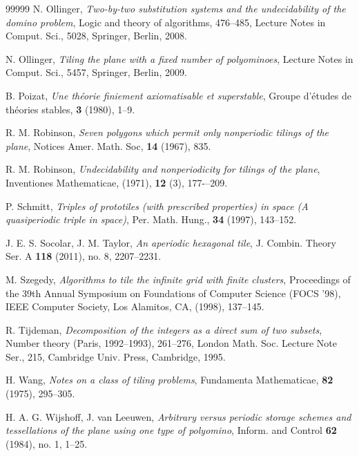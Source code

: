 \documentclass[reqno,a4paper,12pt]{amsart}
\numberwithin{equation}{section}
\numberwithin{figure}{section}
\theoremstyle{plain}
\theoremstyle{definition}
\begin{document}
\begin{thebibliography}{99999}
		N. Ollinger, \emph{Two-by-two substitution systems and the undecidability of the domino problem}, Logic and theory of algorithms, 476–485,
Lecture Notes in Comput. Sci., 5028, Springer, Berlin, 2008.

N. Ollinger, \emph{Tiling the plane with a fixed number of polyominoes},
Lecture Notes in Comput. Sci., 5457, Springer, Berlin, 2009.

		B. Poizat, \emph{Une th\'eorie finiement axiomatisable et superstable}, Groupe d’\'etudes de th\'eories
stables, \textbf{3} (1980), 1--9.

		R. M. Robinson, \emph{Seven polygons which permit only nonperiodic tilings of the plane}, Notices Amer.
Math. Soc, \textbf{14} (1967), 835.
		
		R. M. Robinson,   \emph{Undecidability and nonperiodicity for tilings of the plane}, Inventiones Mathematicae, (1971), \textbf{12} (3), 177-–209.
		
	P. Schmitt, \emph{Triples of prototiles (with prescribed properties) in space (A quasiperiodic triple in space)}, Per. Math. Hung., \textbf{34} (1997), 143--152.
	
J. E. S. Socolar, J. M. Taylor, \emph{An aperiodic hexagonal tile},
J. Combin. Theory Ser. A \textbf{118} (2011), no. 8, 2207--2231.

	M. Szegedy, \emph{Algorithms to tile the infinite grid with finite clusters}, Proceedings of the
39th Annual Symposium on Foundations of Computer Science (FOCS ’98), IEEE Computer Society, Los Alamitos, CA, (1998), 137--145.

		R. Tijdeman, \emph{Decomposition of the integers as a direct sum of two subsets}, Number theory (Paris, 1992--1993), 261--276, London Math. Soc. Lecture Note Ser., 215, Cambridge Univ. Press, Cambridge, 1995.
		
		 H. Wang, \emph{Notes on a class of tiling problems}, Fundamenta Mathematicae, \textbf{82} (1975), 295--305.
		 
		 H. A. G. Wijshoff, J. van Leeuwen, \emph{Arbitrary versus periodic storage schemes and tessellations of the plane using one type of polyomino}, Inform. and Control \textbf{62} (1984), no. 1, 1--25.
	
	\end{thebibliography}
	
	
\end{document}
